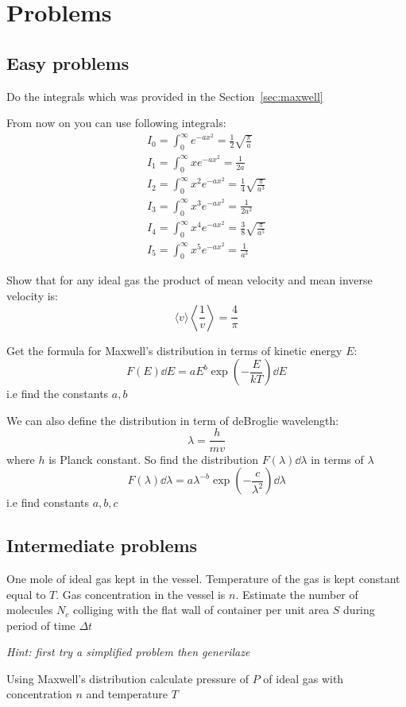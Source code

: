 \documentclass[a4paper, 12pt]{article}
\begin{document}
\section{Problems}
\subsection{Easy problems}
\begin{problem}
    Do the integrals which was provided in the Section~\ref{sec:maxwell}
\end{problem}

From now on you can use following integrals:
\begin{align}
    \label{eq:int0}
    I_0=\int_0^\infty e^{-ax^2}=\frac12\sqrt{\frac{\pi}{a}}\\
    \label{eq:int1}
    I_1=\int_0^\infty xe^{-ax^2}=\frac{1}{2a}\\
    \label{eq:int2}
    I_2=\int_0^\infty x^2e^{-ax^2}=\frac{1}{4}\sqrt{\frac{\pi}{a^3}}\\
    \label{eq:int3}
    I_3=\int_0^\infty x^3e^{-ax^2}=\frac{1}{2a^2}\\
    \label{eq:int4}
    I_4=\int_0^\infty x^4e^{-ax^2}=\frac{3}{8}\sqrt{\frac{\pi}{a^5}}\\
    \label{eq:int5}
    I_5=\int_0^\infty x^5e^{-ax^2}=\frac{1}{a^3}
\end{align}
\begin{problem}
    Show that for any ideal gas the product of mean velocity and mean inverse velocity is:
    $$\langle v\rangle\left<\frac{1}{v}\right> =\frac{4}{\pi}$$
\end{problem}
\begin{problem}
    Get the formula for Maxwell's distribution in terms of kinetic energy $E$:
    $$F(E)\dd E = a E^{b}\exp(-\frac{E}{kT})\dd E$$
    i.e find the constants $a, b$
\end{problem}
\begin{problem}
    We can also define the distribution in term  of deBroglie wavelength:
    $$\lambda=\frac{h}{mv}$$
    where $h$ is Planck constant. So find the distribution $F(\lambda)\dd\lambda$ in terms of $\lambda$
    $$F(\lambda)\dd\lambda=a\lambda^{-b}\exp(-\frac{c}{\lambda^2})\dd \lambda$$
    i.e find constants $a,b,c$
\end{problem}

\subsection{Intermediate problems}
\begin{problem}
    One mole of ideal gas kept in the vessel. Temperature of the gas is kept constant equal to $T$.
    Gas concentration in the vessel is $n$. Estimate the number of molecules $N_c$ colliging with the flat wall of
    container per unit area $S$ during period of time $\Delta t$ 

    \emph{Hint: first try a simplified problem then generilaze}
\end{problem}
\begin{problem}
    Using Maxwell's distribution calculate pressure of $P$ of ideal gas with concentration $n$ and temperature $T$
\end{problem}
\end{document}
